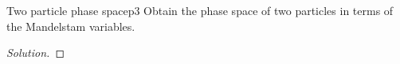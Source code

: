 \begin{problem}{Two particle phase space}{p3}
   Obtain the phase space of two particles in terms of the Mandelstam variables.
\end{problem}
\begin{proof}[Solution]
    
\end{proof}

